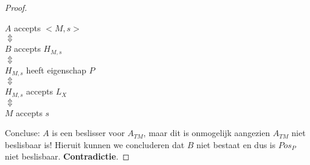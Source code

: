 \documentclass[
10pt,
a4paper,
oneside,
headinclude,footinclude, 
BCOR5mm,
]{scrartcl}
\begin{document}
\begin{proof}
\begin{center}
		$A$ accepts $<M,s>$\\
		$\Updownarrow$\\
		$B$ accepts $H_{M,s}$\\
		$\Updownarrow$\\
		$H_{M,s}$ heeft eigenschap $P$\\
		$\Updownarrow$\\
		$H_{M,s}$ accepts $L_X$\\
		$\Updownarrow$\\
		$M$ accepts $s$
	\end{center}
	Concluse: $A$ is een beslisser voor $A_{TM}$, maar dit is onmogelijk aangezien $A_{TM}$ niet beslisbaar is! Hieruit kunnen we concluderen dat $B$ niet bestaat en dus is $Pos_P$ niet beslisbaar. \textbf{Contradictie}.
\end{proof}


\renewcommand{\refname}{\spacedlowsmallcaps{References}}




\end{document}
